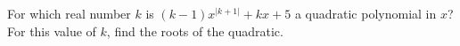For which real number $k$ is $(k-1)x^{|k+1|}+kx+5$ a quadratic polynomial in $x$? For this value of $k$, find the roots of the quadratic.
